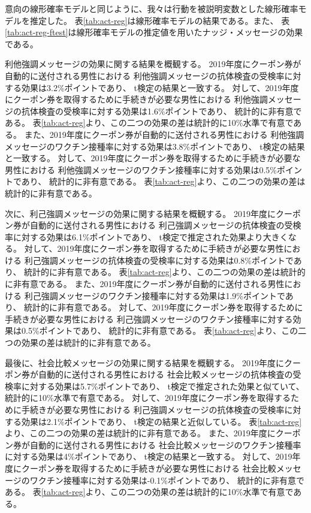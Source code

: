 \documentclass[
  11pt,
  a4paper,
]{article}
\begin{document}
意向の線形確率モデルと同じように、我々は行動を被説明変数とした線形確率モデルを推定した。
表\ref{tab:act-reg}は線形確率モデルの結果である。また、
表\ref{tab:act-reg-ftest}は線形確率モデルの推定値を用いたナッジ・メッセージの効果である。

利他強調メッセージの効果に関する結果を概観する。
2019年度にクーポン券が自動的に送付される男性における
利他強調メッセージの抗体検査の受検率に対する効果は3.2\%ポイントであり、
t検定の結果と一致する。
対して、2019年度にクーポン券を取得するために手続きが必要な男性における
利他強調メッセージの抗体検査の受検率に対する効果は1.6\%ポイントであり、
統計的に非有意である。
表\ref{tab:act-reg}より、この二つの効果の差は統計的に10\%水準で有意である。
また、2019年度にクーポン券が自動的に送付される男性における
利他強調メッセージのワクチン接種率に対する効果は3.8\%ポイントであり、
t検定の結果と一致する。
対して、2019年度にクーポン券を取得するために手続きが必要な男性における
利他強調メッセージのワクチン接種率に対する効果は0.5\%ポイントであり、
統計的に非有意である。
表\ref{tab:act-reg}より、この二つの効果の差は統計的に非有意である。

次に、利己強調メッセージの効果に関する結果を概観する。
2019年度にクーポン券が自動的に送付される男性における
利己強調メッセージの抗体検査の受検率に対する効果は6.1\%ポイントであり、
t検定で推定された効果より大きくなる。
対して、2019年度にクーポン券を取得するために手続きが必要な男性における
利己強調メッセージの抗体検査の受検率に対する効果は0.8\%ポイントであり、
統計的に非有意である。
表\ref{tab:act-reg}より、この二つの効果の差は統計的に非有意である。
また、2019年度にクーポン券が自動的に送付される男性における
利己強調メッセージのワクチン接種率に対する効果は1.9\%ポイントであり、
統計的に非有意である。
対して、2019年度にクーポン券を取得するために手続きが必要な男性における
利己強調メッセージのワクチン接種率に対する効果は0.5\%ポイントであり、
統計的に非有意である。
表\ref{tab:act-reg}より、この二つの効果の差は統計的に非有意である。

最後に、社会比較メッセージの効果に関する結果を概観する。
2019年度にクーポン券が自動的に送付される男性における
社会比較メッセージの抗体検査の受検率に対する効果は5.7\%ポイントであり、
t検定で推定された効果と似ていて、統計的に10\%水準で有意である。
対して、2019年度にクーポン券を取得するために手続きが必要な男性における
利己強調メッセージの抗体検査の受検率に対する効果は2.1\%ポイントであり、
t検定の結果と近似している。
表\ref{tab:act-reg}より、この二つの効果の差は統計的に非有意である。
また、2019年度にクーポン券が自動的に送付される男性における
社会比較メッセージのワクチン接種率に対する効果は4\%ポイントであり、
t検定の結果と一致する。
対して、2019年度にクーポン券を取得するために手続きが必要な男性における
社会比較メッセージのワクチン接種率に対する効果は-0.1\%ポイントであり、
統計的に非有意である。
表\ref{tab:act-reg}より、この二つの効果の差は統計的に10\%水準で有意である。

\clearpage
\end{document}
